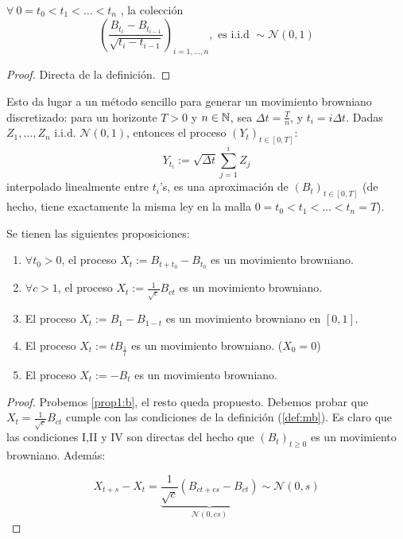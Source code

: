 \begin{proposition}
$\forall ~ 0 = t_0 < t_1 < \ldots < t_n$ , la colección 
\begin{equation*}
        \left( \frac{B_{t_i} - B_{t_{i-1}}}{\sqrt{t_i - t_{i-1}} }
        \right)_{i = 1, \ldots,n}, \text{ es i.i.d } \sim \mathcal{N}(0,1)
\end{equation*}
\end{proposition}
\begin{proof}
\gris
Directa de la definición.
\negro
\end{proof}

Esto da lugar a un método sencillo para generar un movimiento browniano
discretizado: para un horizonte $T > 0$ y $n \in \mathbb{N}$, sea $\Delta t = \frac{T}{n}$, y $t_i = i \Delta t$. 
Dadas $Z_1, \ldots, Z_n$ i.i.d. $\mathcal{N}(0,1)$, entonces el proceso $(Y_{t})_{t \in [0,T]}$: 
\begin{equation*}
    Y_{t_i} := \sqrt{\Delta t} \sum_{j=1}^{i} Z_j
\end{equation*}
interpolado linealmente entre $t_i$'s, es una aproximación de $(B_t)_{t \in
[0,T]}$ (de hecho, tiene exactamente la misma ley en la malla $0 = t_0 < t_1 < \ldots < t_n = T$). 

\begin{proposition}
        Se tienen las siguientes proposiciones:
        \begin{enumerate}
                \item \label{prop1:a} $\forall  t_0 > 0$, el proceso $X_t := B_{t + t_0} -
                        B_{t_0}$ es un movimiento browniano.
                \item \label{prop1:b} $\forall c > 1$, el proceso $X_t :=
                        \frac{1}{\sqrt{c}} B_{ct}$ es un movimiento browniano.
                \item \label{prop1:c} El proceso $X_t := B_1 - B_{1-t}$ es
                        un movimiento browniano en $[0,1]$.
                \item \label{prop1:d} El proceso $X_t := t B_{\frac{1}{t}}$
                        es un movimiento browniano. ($X_0 = 0$)
                \item \label{prop1:e} El proceso $X_t := -B_{t}$ es un movimiento browniano.
        \end{enumerate}
\end{proposition}

\begin{proof}
\gris
Probemos  \ref{prop1:b}, el resto queda propuesto. Debemos probar que
$X_t = \frac{1}{\sqrt{c}} B_{ct}$ cumple con las condiciones de la
definición (\ref{def:mb}). Es claro 
que las condiciones I,II y IV son directas del hecho que $(B_t)_{t \geq
0}$ es un movimiento browniano. Además: 

\begin{equation*}
        X_{t+s} - X_t = \underbrace{\frac{1}{\sqrt{c} } \left( B_{ct + cs} - B_{ct}
        \right)}_{\mathcal{N}(0,cs)} \sim  \mathcal{N}(0,s)
\end{equation*}
\findem
\negro
\end{proof}

